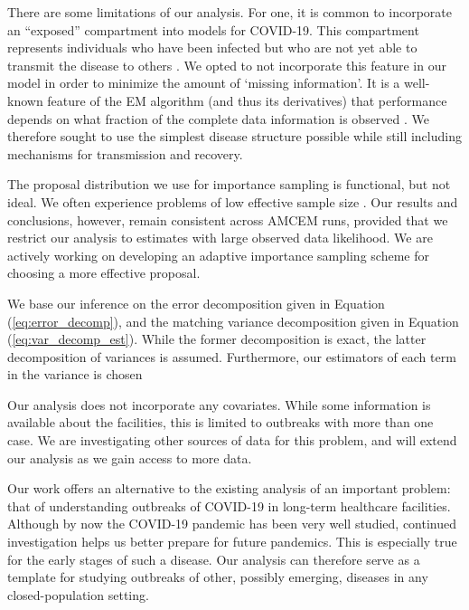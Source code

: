 \documentclass[11pt, oneside]{article}   	%
\begin{document}
There are some limitations of our analysis. For one, it is common to incorporate an ``exposed'' compartment into models for COVID-19. This compartment represents individuals who have been infected but who are not yet able to transmit the disease to others \citep{Kon22}. We opted to not incorporate this feature in our model in order to minimize the amount of `missing information'. It is a well-known feature of the EM algorithm (and thus its derivatives) that performance depends on what fraction of the complete data information is observed \citep{Men94}. We therefore sought to use the simplest disease structure possible while still including mechanisms for transmission and recovery. 

The proposal distribution we use for importance sampling is functional, but not ideal. We often experience problems of low effective sample size \citep[see, e.g.,][for a definition and discussion of effective sample size]{Aga17}. Our results and conclusions, however, remain consistent across AMCEM runs, provided that we restrict our analysis to estimates with large observed data likelihood. We are actively working on developing an adaptive importance sampling scheme \citep{Bug17} for choosing a more effective proposal. 

We base our inference on the error decomposition given in Equation (\ref{eq:error_decomp}), and the matching variance decomposition given in Equation (\ref{eq:var_decomp_est}). While the former decomposition is exact, the latter decomposition of variances is assumed. Furthermore, our estimators of each term in the variance is chosen 

Our analysis does not incorporate any covariates. While some information is available about the facilities, this is limited to outbreaks with more than one case. We are investigating other sources of data for this problem, and will extend our analysis as we gain access to more data.

Our work offers an alternative to the existing analysis of an important problem: that of understanding outbreaks of COVID-19 in long-term healthcare facilities. Although by now the COVID-19 pandemic has been very well studied, continued investigation helps us better prepare for future pandemics. This is especially true for the early stages of such a disease. Our analysis can therefore serve as a template for studying outbreaks of other, possibly emerging, diseases in any closed-population setting.

\end{document}
